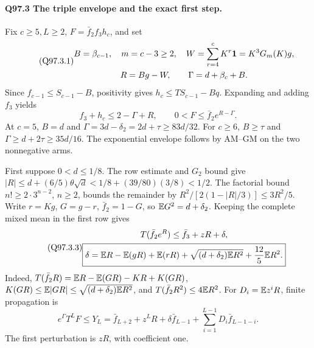 \paragraph{Q97.3 The triple envelope and the exact first step.}
Fix \(c\ge\allowbreak 5,\allowbreak L\ge\allowbreak 2\), \(F=\allowbreak \bar f_2f_3h_c\), and set
\begin{equation}\tag{Q97.3.1}\label{eq:Q97:3.1}
\begin{gathered}
B=\beta_{c-1},\quad m=c-3\ge2,\quad
W=\sum_{r=4}^cK^r\mathbf1=K^3G_m(K)g,\\
R=Bg-W,\qquad\Gamma=d+\beta_c+B.
\end{gathered}
\end{equation}
Since \(f_{c-1}\le\allowbreak  S_{c-1}-B\), positivity gives
\(h_c\le\allowbreak  TS_{c-1}-Bq\). Expanding and adding \(f_3\) yields
\begin{equation}\tag{Q97.3.2}\label{eq:Q97:3.2}
f_3+h_c\le2-\Gamma+R,\qquad0<F\le\bar f_2e^{R-\Gamma}.
\end{equation}
At \(c=\allowbreak 5\), \(B=\allowbreak d\) and \(\Gamma=\allowbreak 3d-\delta_2=\allowbreak 2d+\tau\ge\allowbreak 83d/32\).
For \(c\ge\allowbreak 6\), \(B\ge\allowbreak \tau\) and \(\Gamma\ge\allowbreak  d+2\tau\ge\allowbreak 35d/16\).
The exponential envelope follows by AM--GM on the two nonnegative arms.

First suppose \(0<\allowbreak d\le\allowbreak 1/8\). The row estimate and \(G_2\) bound give
\(|R|\le\allowbreak  d+(6/5)\theta\sqrt d<\allowbreak 1/8+(39/80)(3/8)<\allowbreak 1/2\).
The factorial bound \(n!\ge\allowbreak 2\cdot3^{n-2}\), \(n\ge\allowbreak 2\), bounds the
remainder by \(R^2/[2(1-|R|/3)]\le\allowbreak 3R^2/5\).
Write \(r=\allowbreak Kg\), \(G=\allowbreak g-r\), \(\bar f_2=\allowbreak 1-G\), so \(\mathbb E G^2=\allowbreak d+\delta_2\).
Keeping the complete mixed mean in the first row gives
\begin{equation}\tag{Q97.3.3}\label{eq:Q97:3.3}
\begin{gathered}
T(\bar f_2e^R)\le\bar f_3+zR+\delta,\\
\boxed{\delta=\mathbb E R-\mathbb E(gR)+\mathbb E(rR)
+\sqrt{(d+\delta_2)\mathbb E R^2}+\frac{12}{5}\mathbb E R^2.}
\end{gathered}
\end{equation}
Indeed, \(T(\bar f_2R)=\allowbreak \mathbb E R-\mathbb E(GR)-KR+K(GR)\),
\(K(GR)\le\allowbreak \mathbb E|GR|\le\allowbreak \sqrt{(d+\delta_2)\mathbb E R^2}\), and
\(T(\bar f_2R^2)\le\allowbreak 4\mathbb E R^2\).
For \(D_i=\allowbreak \mathbb E z^iR\), finite propagation is
\begin{equation}\tag{Q97.3.4}\label{eq:Q97:3.4}
e^\Gamma T^LF\le Y_L=\bar f_{L+2}+z^LR+\delta\bar f_{L-1}
+\sum_{i=1}^{L-1}D_i\bar f_{L-1-i}.
\end{equation}
The first perturbation is \(zR\), with coefficient one.

